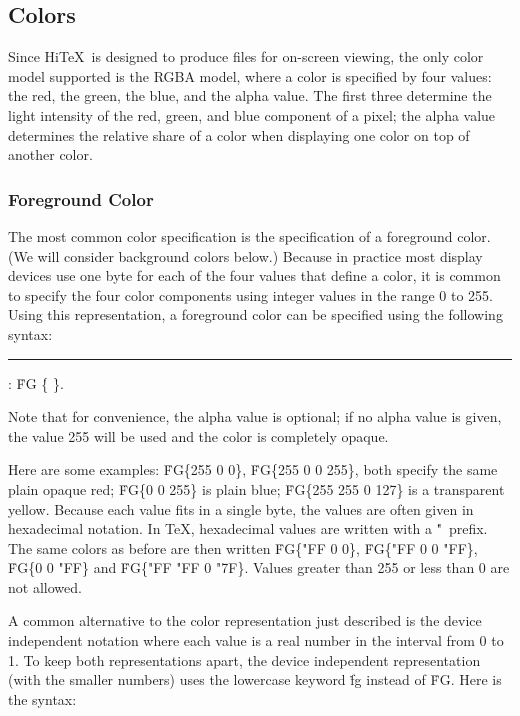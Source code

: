 \subsection{Colors}
Since Hi\TeX\ is designed to produce files for on-screen viewing,
the only color model supported is the RGBA model, where a color is
specified by four values: the red, the green, the blue, and the alpha
value. The first three determine the light intensity of the red,
green, and blue component of a pixel; the alpha value determines
the relative share of a color when displaying
one color on top of another color. 

\subsubsection{Foreground Color}
The most common color specification is the specification of a
foreground color. (We will consider background colors below.)
Because in practice most display devices use one byte for
each of the four values that define a color,
it is common to specify the four color
components using integer values in the range 0 to 255.
Using this representation, a foreground color can be specified using
the following syntax:

\medskip
\rule{}:
   \.{FG} \.{\{}     \.{\}}.
\medskip

Note that for convenience, the alpha value
is optional; if no alpha value is given, the value 255 will be used
and the color is completely opaque.

Here are some examples:
\.{FG\{255 0 0\}}, \.{FG\{255 0 0 255\}},
both specify the same plain opaque red;
\.{FG\{0 0 255\}} is plain blue;
\.{FG\{255 255 0 127\}} is  a transparent yellow.
Because each value fits in a single byte, the values are often given in
hexadecimal notation. In \TeX, hexadecimal values are written with
a \.{"}~prefix. The same colors as before are then written
\.{FG\{"FF 0 0\}}, \.{FG\{"FF 0 0 "FF\}},
\.{FG\{0 0 "FF\}} and \.{FG\{"FF "FF 0 "7F\}}. 
Values greater than 255 or less than 0 are not allowed.

A common alternative to the color representation just described
is the device independent notation where each
value is a real number in the interval from 0 to 1.
To keep both representations apart, the device independent
representation (with the smaller numbers) uses the lowercase
keyword \.{fg} instead of \.{FG}. Here is the syntax:


